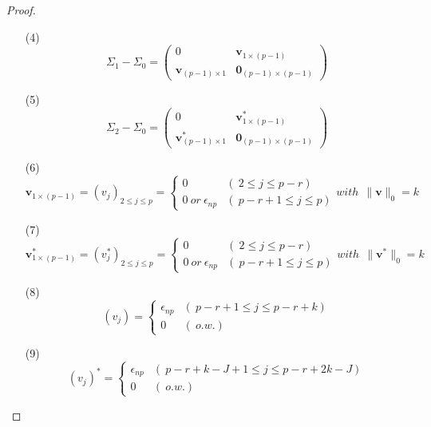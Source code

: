 \begin{proof}
\begin{itemize}
\begin{itemize}
\begin{itemize}
\newpage

    \item[(4)]
$$\Sigma_{1} - \Sigma_{0} =     
\begin{pmatrix} 
0 & \textbf{v}_{1\times(p-1)} \\
\textbf{v}_{(p-1)\times1} & \textbf{0}_{(p-1)\times(p-1)}
\end{pmatrix}$$

\vspace{5mm}

\item[(5)]
$$\Sigma_{2} - \Sigma_{0} =     
\begin{pmatrix} 
0 & {\textbf{v}}^*_{1\times(p-1)} \\
{\textbf{v}}^*_{(p-1)\times1} & \textbf{0}_{(p-1)\times(p-1)}
\end{pmatrix}$$

\vspace{5mm}

\item[(6)]
$$\textbf{v}_{1\times(p-1)}=(v_j)_{2\leq{j}\leq{p}}= \begin{cases} 0 & (~{2\leq{j}\leq{p-r}}) \\ 0~or~\epsilon_{np} & (~ {{p-r+1}\leq{j}\leq{p}}) \end{cases} with~~ \|\textbf{v}\|_0 = k$$

\vspace{5mm}

\item[(7)]
$${\textbf{v}}^*_{1\times(p-1)}=({v}^*_j)_{2\leq{j}\leq{p}}= \begin{cases} 0 & (~{2\leq{j}\leq{p-r}}) \\ 0~or~\epsilon_{np} & (~ {{p-r+1}\leq{j}\leq{p}}) \end{cases} with~~ \|{\textbf{v}}^*\|_0 = k$$

\vspace{5mm}

\item[(8)]
$$(v_j)= \begin{cases} \epsilon_{np} & (~{p-r+1\leq{j}\leq{p-r+k}}) \\ 0 & (~ {o.w.}) \end{cases}$$

\vspace{5mm}

\item[(9)]
$$(v_j)^*= \begin{cases} \epsilon_{np} & (~{p-r+k-J+1\leq{j}\leq{p-r+2k-J}}) \\ 0 & (~ {o.w.}) \end{cases}$$



\end{itemize}
\end{itemize}
\end{itemize}
\end{proof}
